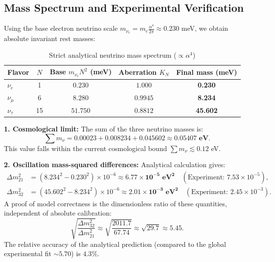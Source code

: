 \documentclass[11pt,a4paper]{article}
\begin{document}
\subsection{Mass Spectrum and Experimental Verification}
Using the base electron neutrino scale $m_{\nu_e} = m_e \frac{\alpha^4}{2\pi} \approx 0.230$ meV, we obtain absolute invariant rest masses:

\begin{table}[h]
\centering
\caption{Strict analytical neutrino mass spectrum ($\propto \alpha^4$)}
\renewcommand{\arraystretch}{1.3}
\begin{tabular}{lcccc}
\toprule
Flavor & $N$ & Base $m_{\nu_e} N^2$ (meV) & Aberration $K_N$ & Final mass (meV) \\
\midrule
$\nu_e$   & 1  & $0.230$  & $1.000$ & \textbf{0.230} \\
$\nu_\mu$ & 6  & $8.280$  & $0.9945$ & \textbf{8.234} \\
$\nu_\tau$ & 15 & $51.750$ & $0.8812$ & \textbf{45.602} \\
\bottomrule
\end{tabular}
\end{table}

\textbf{1. Cosmological limit:}
The sum of the three neutrino masses is:
\begin{equation}
\sum m_\nu = 0.00023 + 0.008234 + 0.045602 \approx \mathbf{0.05407 \text{ eV}}.
\end{equation}
This value falls within the current cosmological bound $\sum m_\nu \lesssim 0.12$ eV.

\textbf{2. Oscillation mass-squared differences:}
Analytical calculation gives:
\begin{align}
\Delta m^2_{21} &= (8.234^2 - 0.230^2) \times 10^{-6} \approx \mathbf{6.77 \times 10^{-5} \text{ eV}^2} \quad (\text{Experiment: } 7.53 \times 10^{-5}), \\
\Delta m^2_{32} &= (45.602^2 - 8.234^2) \times 10^{-6} \approx \mathbf{2.01 \times 10^{-3} \text{ eV}^2} \quad (\text{Experiment: } 2.45 \times 10^{-3}).
\end{align}
A proof of model correctness is the dimensionless ratio of these quantities, independent of absolute calibration:
\begin{equation}
\sqrt{\frac{\Delta m^2_{32}}{\Delta m^2_{21}}} \approx \sqrt{\frac{2011.7}{67.74}} \approx \sqrt{29.7} \approx \mathbf{5.45}.
\end{equation}
The relative accuracy of the analytical prediction (compared to the global experimental fit $\sim 5.70$) is $4.3\%$.
\end{document}
